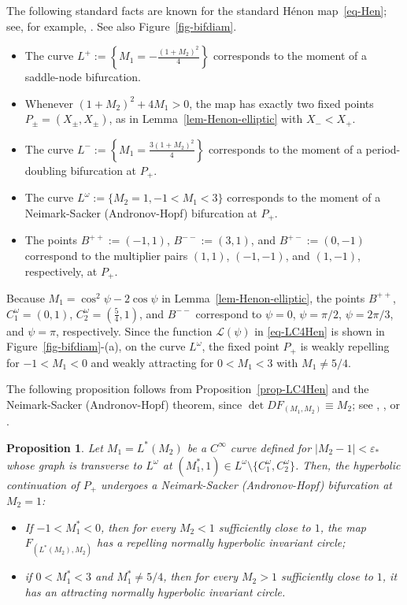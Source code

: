 \documentclass[11pt,a4paper]{article}
\theoremstyle{plain}
\newtheorem{proposition}[theorem]{Proposition}%
\theoremstyle{definition}
\theoremstyle{plain}
\numberwithin{equation}{section}
\begin{document}
The following standard facts are known for the standard H\'enon map~\eqref{eq-Hen}; see, for example, \cite{HitzlZele1985}. See also Figure~\ref{fig-bifdiam}.
\begin{itemize}
\item The curve $L^+ := \left\{M_1 = -\frac{(1+M_2)^2}{4}\right\}$ corresponds to the moment of a saddle-node bifurcation.
\item Whenever $(1+M_2)^2 + 4M_1 > 0$, the map has exactly two fixed points $P_\pm = (X_\pm, X_\pm)$, as in Lemma~\ref{lem-Henon-elliptic} with $X_- < X_+$.
\item The curve $L^- := \left\{M_1 = \frac{3(1+M_2)^2}{4}\right\}$ corresponds to the moment of a period-doubling bifurcation at $P_+$.
\item The curve $L^\omega := \{M_2 = 1, -1 < M_1 < 3\}$ corresponds to the moment of a Neimark-Sacker (Andronov-Hopf) bifurcation at $P_+$.
\item The points $B^{++} := (-1,1)$, $B^{--} := (3,1)$, and $B^{+-} := (0,-1)$ correspond to the multiplier pairs $(1,1)$, $(-1,-1)$, and $(1,-1)$, respectively, at $P_+$.
\end{itemize}
Because $M_1 = \cos^2\psi - 2\cos\psi$ in Lemma~\ref{lem-Henon-elliptic}, the points $B^{++}$, $C_1^\omega = (0,1)$, $C_2^\omega = \left(\frac{5}{4},1\right)$, and $B^{--}$ correspond to $\psi = 0$, $\psi = \pi/2$, $\psi = 2\pi/3$, and $\psi = \pi$, respectively. Since the function $\mathcal{L}(\psi)$ in \eqref{eq-LC4Hen} is shown in Figure~\ref{fig-bifdiam}-(a), on the curve $L^\omega$, the fixed point $P_+$ is weakly repelling for $-1 < M_1 < 0$ and weakly attracting for $0 < M_1 < 3$ with $M_1 \neq 5/4$.

The following proposition follows from Proposition~\ref{prop-LC4Hen} and the Neimark-Sacker (Andronov-Hopf) theorem, since $\det DF_{(M_1,M_2)} \equiv M_2$; see \cite[theorem~7.2]{RT1971}, \cite[theorem~6.2]{MarsdenMcCracken1976}, or \cite[Section~4]{K2023}.

\begin{proposition}\label{prop-Henon-NS}
Let $M_1 = L^*(M_2)$ be a $C^\infty$ curve defined for $|M_2 - 1| < \varepsilon_*$ whose graph is transverse to $L^\omega$ at $(M_1^*,1) \in L^\omega \setminus \{C_1^\omega,C_2^\omega\}$. Then, the hyperbolic continuation of $P_+$ undergoes a Neimark-Sacker (Andronov-Hopf) bifurcation at $M_2 = 1$:
\begin{itemize}
\item If $-1 < M_1^* < 0$, then for every $M_2 < 1$ sufficiently close to $1$, the map $F_{(L^*(M_2), M_2)}$ has a repelling normally hyperbolic invariant circle;
\item if $0 < M_1^* < 3$ and $M_1^* \neq 5/4$, then for every $M_2 > 1$ sufficiently close to $1$, it has an attracting normally hyperbolic invariant circle.
\end{itemize}
\end{proposition}
\end{document}
